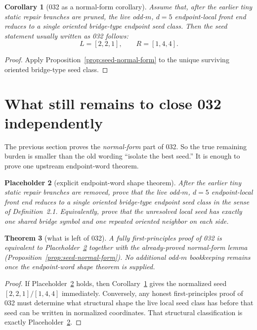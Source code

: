 \documentclass[11pt]{article}
\newtheorem{theorem}{Theorem}[section]
\newtheorem{corollary}[theorem]{Corollary}
\newtheorem{placeholder}[theorem]{Placeholder}
\begin{document}
\begin{corollary}[032 as a normal-form corollary]
\label{cor:032-from-bridge-form}
Assume that, after the earlier tiny static repair branches are pruned, the live
odd-$m$, $d=5$ endpoint-local front end reduces to a single oriented
bridge-type endpoint seed class.
Then the seed statement usually written as \textup{032} follows:
\[
L=[2,2,1],\qquad R=[1,4,4].
\]
\end{corollary}

\begin{proof}
Apply Proposition~\ref{prop:seed-normal-form} to the unique surviving oriented
bridge-type seed class.
\end{proof}

\section{What still remains to close 032 independently}

The previous section proves the \emph{normal-form} part of \textup{032}.
So the true remaining burden is smaller than the old wording
``isolate the best seed.''
It is enough to prove one upstream endpoint-word theorem.

\begin{placeholder}[explicit endpoint-word shape theorem]
\label{ph:shape}
After the earlier tiny static repair branches are removed, prove that the live
odd-$m$, $d=5$ endpoint-local front end reduces to a single oriented
bridge-type endpoint seed class in the sense of Definition~2.1.
Equivalently, prove that the unresolved local seed has exactly one shared bridge
symbol and one repeated oriented neighbor on each side.
\end{placeholder}

\begin{theorem}[what is left of 032]
\label{thm:032-reduced-placeholder}
A fully first-principles proof of \textup{032} is equivalent to
Placeholder~\ref{ph:shape} together with the already-proved normal-form lemma
(Proposition~\ref{prop:seed-normal-form}).
No additional odd-$m$ bookkeeping remains once the endpoint-word shape theorem
is supplied.
\end{theorem}

\begin{proof}
If Placeholder~\ref{ph:shape} holds, then
Corollary~\ref{cor:032-from-bridge-form} gives the normalized seed
$[2,2,1]/[1,4,4]$ immediately.
Conversely, any honest first-principles proof of \textup{032} must determine
what structural shape the live local seed class has before that seed can be
written in normalized coordinates.
That structural classification is exactly Placeholder~\ref{ph:shape}.
\end{proof}
\end{document}
